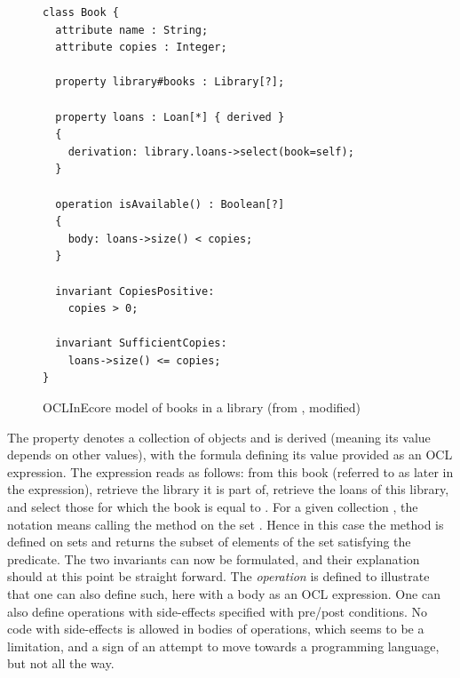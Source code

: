 \begin{figure}
\begin{lstlisting}[language=oclinecore,frame=single,backgroundcolor=\color{light-gray}]
class Book {
  attribute name : String;
  attribute copies : Integer;

  property library#books : Library[?];
     
  property loans : Loan[*] { derived }
  {
    derivation: library.loans->select(book=self);
  }

  operation isAvailable() : Boolean[?]
  {
    body: loans->size() < copies;
  }
     
  invariant CopiesPositive:
    copies > 0;
     
  invariant SufficientCopies:
    loans->size() <= copies;     
}
\end{lstlisting}
\caption{OCLInEcore model of books in a library (from \cite{?}, modified)}
\label{fig:book-oclinecore}
\end{figure}

The property  denotes a collection of  
objects and is derived (meaning its value depends on other values), 
with the formula defining 
its value provided as an OCL expression.
The expression reads as follows: from this book (referred to as 
 later in the expression), retrieve the library it is 
part of, retrieve the 
loans of this library, and select those for which the book is 
equal to . For a given collection , the 
notation  means calling the method  on the 
set . Hence in this case the
 method is defined on sets and returns the 
subset of elements of the set satisfying the predicate.
The two invariants can now be formulated, and their explanation should at this point be straight forward.
The {\em operation}  is defined to illustrate that one can also define such, here with a body as an 
OCL expression. One can also define operations with side-effects specified with pre/post conditions. No code with side-effects is allowed in 
bodies of operations, which seems to be a limitation, and a sign
of an attempt to move towards a programming language, but not all
the way.

